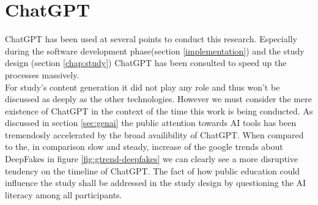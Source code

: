 \documentclass[
  a4paper,  %
  twoside,  %
  bibliography=totoc,
  headsepline,
  cleardoublepage=empty,
  parskip=half,
  draft=false
]{scrbook}
\begin{document}
\section{ChatGPT}
ChatGPT has been used at several points to conduct this research. Especially during the software development phase(section \ref{implementation}) and the study design (section \ref{chap:study}) ChatGPT has been consulted to speed up the processes massively. \\ 
For study's content generation it did not play any role and thus won't be discussed as deeply as the other technologies. However we must consider the mere existence of ChatGPT in the context of the time this work is being conducted. As discussed in section \ref{sec:genai} the public attention towards AI tools has been tremendosly accelerated by the broad availibility of ChatGPT. When compared to the, in comparison slow and steady, increase of the google trends about DeepFakes in figure \ref{fig:gtrend-deepfakes} we can clearly see a more disruptive tendency on the timeline of ChatGPT.
The fact of how public education could influence the study shall be addressed in the study design by questioning the AI literacy among all participants. 
\end{document}
